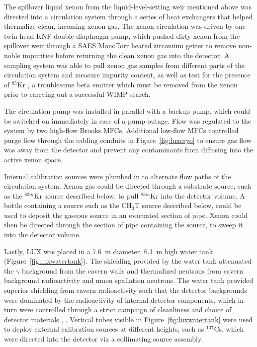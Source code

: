 The spillover liquid xenon from the liquid-level-setting weir mentioned above was directed into a circulation system through a series of heat exchangers that helped thermalize clean, incoming xenon gas. The xenon circulation was driven by one twin-head KNF double-diaphragm pump, which pushed dirty xenon from the spillover weir through a SAES MonoTorr heated zirconium getter to remove non-noble impurities before returning the clean xenon gas into the detector. A sampling system was able to pull xenon gas samples from different parts of the circulation system and measure impurity content, as well as test for the presence of $^{85}$Kr \cite{Dobi2011}, a troublesome beta emitter which must be removed from the xenon prior to carrying out a successful \ac{WIMP} search.

The circulation pump was installed in parallel with a backup pump, which could be switched on immediately in case of a pump outage. Flow was regulated to the system by two high-flow Brooks \ac{MFC}s. Additional low-flow \ac{MFC}s controlled purge flow through the cabling conduits in Figure~\ref{fig:luxcryo} to ensure gas flow was away from the detector and prevent any contaminants from diffusing into the active xenon space.

Internal calibration sources were plumbed in to alternate flow paths of the circulation system. Xenon gas could be directed through a substrate source, such as the $^{83m}$Kr source described below, to pull $^{83m}$Kr into the detector volume. A bottle containing a source such as the CH$_{3}$T source described below, could be used to deposit the gaseous source in an evacuated section of pipe. Xenon could then be directed through the section of pipe containing the source, to sweep it into the detector volume. 

Lastly, \ac{LUX} was placed in a 7.6~m diameter, 6.1~m high water tank (Figure~\ref{fig:luxwatertank}). The shielding provided by the water tank attenuated the $\gamma$ background from the cavern walls and thermalized neutrons from cavern background radioactivity and muon spallation neutrons. The water tank provided superior shielding from cavern radioactivity such that the detector backgrounds were dominated by the radioactivity of internal detector components, which in turn were controlled through a strict campaign of cleanliness and choice of detector materials \cite{LUXDetectorPaper}, \cite{LUXRun03Backgrounds}. Vertical tubes visible in Figure~\ref{fig:luxwatertank} were used to deploy external calibration sources at different heights, such as $^{137}$Cs, which were directed into the detector via a collimating source assembly.


